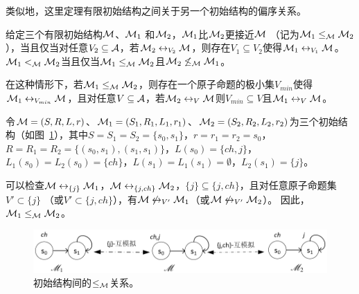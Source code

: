 类似地，这里定理有限初始结构之间关于另一个初始结构的偏序关系。
\begin{definition}\label{def:closer}
	给定三个有限初始结构${\cal M}$、${\cal M}_1$ 和${\cal M}_2$，${\cal M}_1$比${\cal M}_2$更接近${\cal M}$ （记为${\cal M}_1 \leq_{{\cal M}} {\cal M}_2$），当且仅当对任意$V_2 \subseteq \mathcal{A}$，若${\cal M}_2 \leftrightarrow_{V_2} {\cal M}$，则存在$V_1 \subseteq V_2$使得${\cal M}_1 \leftrightarrow_{V_1} {\cal M}$。
	${\cal M}_1 <_{{\cal M}} {\cal M}_2$当且仅当${\cal M}_1 \leq_{{\cal M}} {\cal M}_2$且${\cal M}_2 \not \leq_{{\cal M}} {\cal M}_1$。
\end{definition}

在这种情形下，若${\cal M}_1 \leq_{{\cal M}} {\cal M}_2$，则存在一个原子命题的极小集$V_{min}$使得${\cal M}_1 \leftrightarrow_{V_{min}} {\cal M}$，且对任意$V\subseteq {\cal A}$，若${\cal M}_2 \leftrightarrow_V {\cal M}$则$V_{min}\subseteq V$且${\cal M}_1 \leftrightarrow_V {\cal M}$。
\begin{example}
	令${\cal M}= (S, R, L, r)$、${\cal M}_1 = (S_1, R_1, L_1, r_1)$、${\cal M}_2 = (S_2, R_2, L_2, r_2)$为三个初始结构（如图~\ref{fig:partialo}），其中$S = S_1 = S_2 = \{s_0, s_1\}$，$r=r_1=r_2= s_0$，$R=R_1=R_2=\{(s_0, s_1), (s_1, s_1)\}$，$L(s_0) = \{ch, j\}$，$L_1(s_0) = L_2(s_0) = \{ch\}$，$L(s_1) = L_1(s_1)=\emptyset$，$L_2(s_1) = \{j\}$。
	
	可以检查${\cal M} \leftrightarrow_{\{j\}} {\cal M}_1$，${\cal M} \leftrightarrow_{\{j,ch\}} {\cal M}_2$，$\{j\}\subseteq \{j,ch\}$，且对任意原子命题集$V' \subset \{j\}$ （或$V' \subset \{j,ch\}$），有${\cal M} \not\leftrightarrow_{V'} {\cal M}_1$（或${\cal M} \not \leftrightarrow_{V'} {\cal M}_2$）。
	因此，${\cal M}_1 \leq_{{\cal M}} {\cal M}_2$。
	\begin{figure}[h]%
		\centering
		\includegraphics[width=12cm]{figures/chapter06/partial_order2.png}
		\caption{初始结构间的$\leq_{{\cal M}}$关系。}\label{fig:partialo}
		
	\end{figure}
\end{example}

